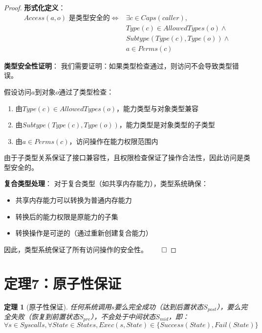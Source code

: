\documentclass{article}
\newtheorem{theorem}{定理}[section]
\theoremstyle{definition}
\theoremstyle{remark}
\begin{document}
\begin{proof}
    \textbf{形式化定义}：
    \begin{align*}
        Access(a, o) \text{ 是类型安全的} \iff 
        &\exists c \in Caps(caller), \\
        &Type(c) \in AllowedTypes(o) \land \\
        &Subtype(Type(c), Type(o)) \land \\
        &a \in Perms(c)
    \end{align*}

    \textbf{类型安全性证明}：
    我们需要证明：如果类型检查通过，则访问不会导致类型错误。

    假设访问$a$到对象$o$通过了类型检查：
    \begin{enumerate}
        \item 由$Type(c) \in AllowedTypes(o)$，能力类型与对象类型兼容
        \item 由$Subtype(Type(c), Type(o))$，能力类型是对象类型的子类型
        \item 由$a \in Perms(c)$，访问操作在能力权限范围内
    \end{enumerate}

    由于子类型关系保证了接口兼容性，且权限检查保证了操作合法性，因此访问是类型安全的。

    \textbf{复合类型处理}：
    对于复合类型（如共享内存能力），类型系统确保：
    \begin{itemize}
        \item 共享内存能力可以转换为普通内存能力
        \item 转换后的能力权限是原能力的子集
        \item 转换操作是可逆的（通过重新创建复合能力）
    \end{itemize}

    因此，类型系统保证了所有访问操作的安全性。$\qed$
\end{proof}

\section{定理7：原子性保证}

\begin{theorem}[原子性保证]
    任何系统调用$s$要么完全成功（达到后置状态$S_{post}$），要么完全失败（恢复到前置状态$S_{pre}$），不会处于中间状态$S_{mid}$，即：
    \[
    \forall s \in Syscalls, \forall State \in States, Exec(s, State) \in \{Success(State), Fail(State)\}
    \]
\end{theorem}
\end{document}
